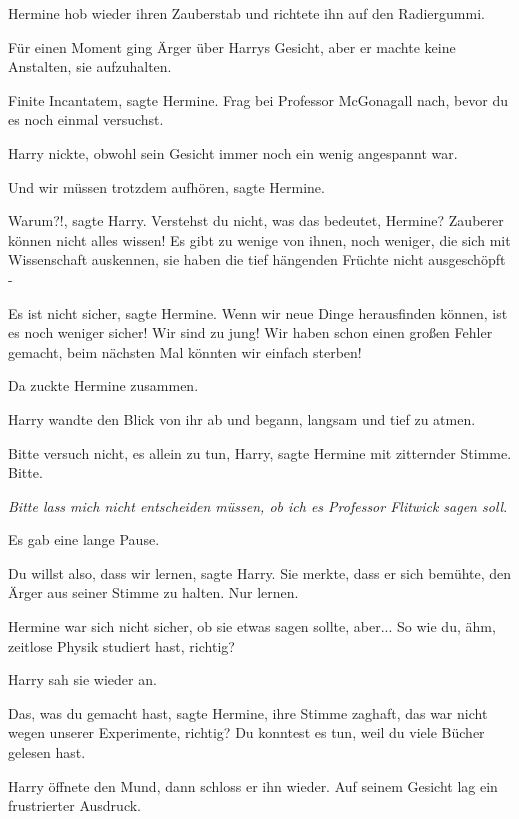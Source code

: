 Hermine hob wieder ihren Zauberstab und richtete ihn auf den Radiergummi.

Für einen Moment ging Ärger über Harrys Gesicht, aber er machte keine Anstalten,
sie aufzuhalten.

\glqq{}Finite Incantatem\grqq{}, sagte Hermine. \glqq{}Frag bei Professor
McGonagall nach, bevor du es noch einmal versuchst.\grqq{}

Harry nickte, obwohl sein Gesicht immer noch ein wenig angespannt war.

\glqq{}Und wir müssen trotzdem aufhören\grqq{}, sagte Hermine.

\glqq{}Warum?!\grqq{}, sagte Harry. \glqq{}Verstehst du nicht, was das bedeutet,
Hermine? Zauberer können nicht alles wissen! Es gibt zu wenige von ihnen, noch
weniger, die sich mit Wissenschaft auskennen, sie haben die tief hängenden
Früchte nicht ausgeschöpft -\grqq{}

\glqq{}Es ist nicht sicher\grqq{}, sagte Hermine. \glqq{}Wenn wir neue Dinge
herausfinden können, ist es noch weniger sicher! Wir sind zu jung! Wir haben
schon einen großen Fehler gemacht, beim nächsten Mal könnten wir einfach
sterben!\grqq{}

Da zuckte Hermine zusammen.

Harry wandte den Blick von ihr ab und begann, langsam und tief zu atmen.

\glqq{}Bitte versuch nicht, es allein zu tun, Harry\grqq{}, sagte Hermine mit
zitternder Stimme. \glqq{}Bitte.\grqq{}

\emph{Bitte lass mich nicht entscheiden müssen, ob ich es Professor Flitwick
sagen soll}.

Es gab eine lange Pause.

\glqq{}Du willst also, dass wir lernen\grqq{}, sagte Harry. Sie merkte, dass er
sich bemühte, den Ärger aus seiner Stimme zu halten. \glqq{}Nur lernen.\grqq{}

Hermine war sich nicht sicher, ob sie etwas sagen sollte, aber... \glqq{}So wie
du, ähm, zeitlose Physik studiert hast, richtig?\grqq{}

Harry sah sie wieder an.

\glqq{}Das, was du gemacht hast\grqq{}, sagte Hermine, ihre Stimme zaghaft,
\glqq{}das war nicht wegen unserer Experimente, richtig? Du konntest es tun,
weil du viele Bücher gelesen hast.\grqq{}

Harry öffnete den Mund, dann schloss er ihn wieder. Auf seinem Gesicht lag ein
frustrierter Ausdruck.

